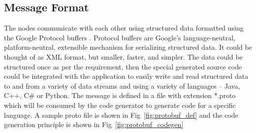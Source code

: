 \subsection{Message Format}
	The nodes communicate with each other using structured data formatted using the Google Protocol buffers \cite{ProtocolBuffers}. Protocol buffers are Google's language-neutral, platform-neutral, extensible mechanism for serializing structured data. It could be thought of as XML format, but smaller, faster, and simpler. The data could be structured once as per the requirement, then the special generated source code could be integrated with the application to easily write and read structured data to and from a variety of data streams and using a variety of languages – Java, C++, C\# or Python. The message is defined in a file with extension *.proto which will be consumed by the code generator to generate code for a specific language. A sample proto file is shown in Fig~\ref{fig:protobuf_def} and the code generation principle is shown in Fig~\ref{fig:protobuf_codegen}
